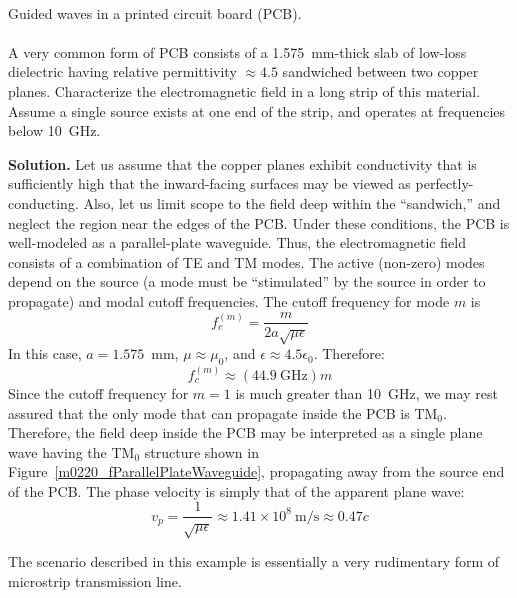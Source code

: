 ~\\ \begin{example} 
\begin{mdframed}[backgroundcolor=brown!20,linecolor=brown!20]\raggedright
Guided waves in a printed circuit board (PCB).
\\~\\
A very common form of PCB consists of a 1.575~mm-thick slab of low-loss dielectric having relative permittivity $\approx 4.5$ sandwiched between two copper planes.
Characterize the electromagnetic field in a long strip of this material.
Assume a single source exists at one end of the strip, and operates at frequencies below 10~GHz.

{\bf Solution.}
Let us assume that the copper planes exhibit conductivity that is sufficiently high that the inward-facing surfaces may be viewed as perfectly-conducting.
Also, let us limit scope to the field deep within the ``sandwich,'' and neglect the region near the edges of the PCB.
Under these conditions, the PCB is well-modeled as a parallel-plate waveguide.
Thus, the electromagnetic field consists of a combination of TE and TM modes.
The active (non-zero) modes depend on the source (a mode must be ``stimulated'' by the source in order to propagate) and modal cutoff frequencies.
The cutoff frequency for mode $m$ is 
%
\begin{equation}
f^{(m)}_c = \frac{m}{2a\sqrt{\mu\epsilon}}
\end{equation}
%
In this case, $a=1.575$~mm, $\mu\approx\mu_0$, and $\epsilon\approx 4.5\epsilon_0$.  Therefore:
%
\begin{equation}
f^{(m)}_c \approx \left( 44.9~\mbox{GHz} \right) m
\end{equation}
%
Since the cutoff frequency for $m=1$ is much greater than 10~GHz, we may rest assured that the only mode that can propagate inside the PCB is TM$_0$.
Therefore, the field deep inside the PCB may be interpreted as a single plane wave having the TM$_0$ structure shown in Figure~\ref{m0220_fParallelPlateWaveguide}, propagating away from the source end of the PCB.
The phase velocity is simply that of the apparent plane wave:
%
\begin{equation}
v_p = \frac{1}{\sqrt{\mu\epsilon}} \approx 1.41 \times 10^8~\mbox{m/s} \approx 0.47c
\end{equation}
%
\end{mdframed}
\end{example}
%
The scenario described in this example is essentially a very rudimentary form of microstrip transmission line.


